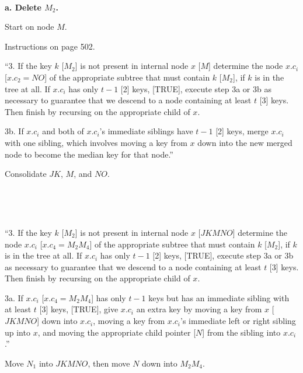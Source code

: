 \

{\bf a. Delete $M_2$.} 

Start on node $M$.  

Instructions on page 502.  

``3.  If the key $k$ [$M_2$] is not present in internal node $x$ [$M$] determine the node $x.c_i$ [$x.c_2 = NO$] of the appropriate subtree that must contain $k$ [$M_2$], if $k$ is in the tree at all.  If $x.c_i$ has only $t-1$ [2] keys, [TRUE], execute step 3a or 3b as necessary to guarantee that we descend to a node containing at least $t$ [3] keys.  Then finish by recursing on the appropriate child of $x$.  

3b.  If $x.c_i$ and both of $x.c_i$'s immediate siblings have $t-1$ [2] keys, merge $x.c_i$ with one sibling, which involves moving a key from $x$ down into the new merged node to become the median key for that node.''  

Consolidate $JK$, $M$, and $NO$.

\

\hfil{}

\

``3.  If the key $k$ [$M_2$] is not present in internal node $x$ [$JKMNO$] determine the node $x.c_i$ [$x.c_4 = M_2M_4$] of the appropriate subtree that must contain $k$ [$M_2$], if $k$ is in the tree at all.  If $x.c_i$ has only $t-1$ [2] keys, [TRUE], execute step 3a or 3b as necessary to guarantee that we descend to a node containing at least $t$ [3] keys.  Then finish by recursing on the appropriate child of $x$.  

3a.  If $x.c_i$ [$x.c_4 = M_2M_4$] has only $t-1$ keys but has an immediate sibling with at least $t$ [3] keys, [TRUE], give $x.c_i$ an extra key by moving a key from $x$ [$JKMNO$] down into $x.c_i$, moving a key from $x.c_i$'s immediate left or right sibling up into $x$, and moving the appropriate child pointer [$N$] from the sibling into $x.c_i$.''

Move $N_1$ into $JKMNO$, then move $N$ down into $M_2M_4$.  

